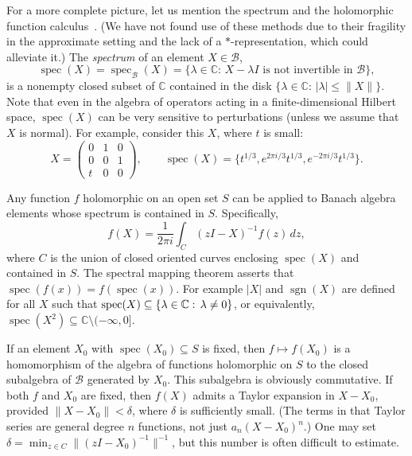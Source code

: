 \documentclass[12pt]{article}
\newcommand{\CC}{\mathbb{C}}
\newcommand{\calB}{\mathcal{B}}
\DeclareMathOperator{\sgn}{sgn}
\DeclareMathOperator{\spec}{spec}
\renewcommand{\le}{\leqslant}
\let\oldRe\Re
\let\Re\relax
\DeclareMathOperator{\Re}{\oldRe}
\newtheorem[definition]{Definition}[Theorem]{Definition}
\newtheorem[remark]{Example}[Theorem]{Example}
\newtheorem[remark]{Remark}[Theorem]{Remark}
\newtheorem[remark]{Question}[Theorem]{Open question}
\newtheorem*[definition]{definition}{Definition}
\newtheorem*[remark]{example}{Example}
\newtheorem*[remark]{remark}{Remark}
\newtheorem*[remark]{question}{Open question}
\numberwithin{equation}{section}
\begin{document}
For a more complete picture, let us mention the spectrum and the holomorphic function calculus~\cite[chapter~3]{KaRi}. (We have not found use of these methods due to their fragility in the approximate setting and the lack of a $*$-representation, which could alleviate it.) The \emph{spectrum} of an element $X\in\calB$, 
\begin{equation}
\spec(X)=\spec_{\calB}(X)=\{\lambda\in\CC:\, X-\lambda I
\text{ is not invertible in }\calB\},
\end{equation}
is a nonempty closed subset of $\CC$ contained in the disk $\{\lambda\in\CC:\,|\lambda|\le\|X\|\}$. Note that even in the algebra of operators acting in a finite-dimensional Hilbert space, $\spec(X)$ can be very sensitive to perturbations (unless we assume that $X$ is normal). For example, consider this $X$, where $t$ is small:
\begin{equation}
X=\begin{pmatrix}0&1&0\\ 0&0&1\\ t&0&0 \end{pmatrix},\qquad
\spec(X)=\{t^{1/3},e^{2\pi i/3}t^{1/3},e^{-2\pi i/3}t^{1/3}\}.
\end{equation}

Any function $f$ holomorphic on an open set $S$ can be applied to Banach algebra elements whose spectrum is contained in $S$. Specifically,
\begin{equation}
f(X)=\frac{1}{2\pi i}\int_{C}(zI-X)^{-1}f(z)\,dz,
\end{equation}
where $C$ is the union of closed oriented curves enclosing $\spec(X)$ and contained in $S$. The spectral mapping theorem asserts that $\spec(f(x))=f(\spec(x))$. For example $|X|$ and $\sgn(X)$ are defined for all $X$ such that $\spec(X) \subseteq\{\lambda\in\CC:\,\Re\lambda\not=0\}$, or equivalently, $\spec(X^2) \subseteq\CC\setminus(-\infty,0]$.

If an element $X_0$ with $\spec(X_0)\subseteq S$ is fixed, then $f\mapsto f(X_0)$ is a homomorphism of the algebra of functions holomorphic on $S$ to the closed subalgebra of $\calB$ generated by $X_0$. This subalgebra is obviously commutative. If both $f$ and $X_0$ are fixed, then $f(X)$ admits a Taylor expansion in $X-X_0$, provided $\|X-X_0\|<\delta$, where $\delta$ is sufficiently small. (The terms in that Taylor series are general degree $n$ functions, not just $a_n(X-X_0)^n$.) One may set $\delta=\min_{z\in C}\|(zI-X_0)^{-1}\|^{-1}$, but this number is often difficult to estimate.\medskip
\end{document}
